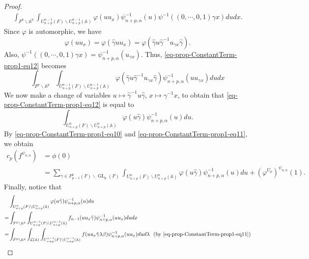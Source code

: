 \documentclass[12pt]{amsart}
\newcommand{\A}{\mathbb{A}}
\theoremstyle{remark}
\DeclareMathOperator{\GL}{GL}
\begin{document}
\begin{proof}
\begin{equation}
\label{eq-prop-ConstantTerm-prop1-eq12}
\begin{split}
\int_{F^p\backslash \A^p} 	\int_{U_{n+p}^{n-1}(F)\backslash U_{n+p}^{n-1}(\A)} \varphi( u u_x) \psi_{n+p,\alpha}^{-1}(u ) \psi^{-1}( (0, \cdots, 0,1)\gamma x)dudx.
\end{split}
\end{equation}
Since $\varphi$ is automorphic, we have
\begin{equation*}
\varphi( u u_x)= \varphi( \hat{\gamma} u u_x) = 	\varphi( \hat{\gamma} u \hat{\gamma}^{-1}  u_{\gamma x} \hat{\gamma}).
\end{equation*}
Also, $\psi^{-1}( (0, \cdots, 0,1)\gamma x)=\psi_{n+p,\alpha}^{-1}( u_{\gamma x})$.
Thus, \eqref{eq-prop-ConstantTerm-prop1-eq12} becomes
\begin{equation*}
	\int_{F^p\backslash \A^p} 	\int_{U_{n+p}^{n-1}(F)\backslash U_{n+p}^{n-1}(\A)} \varphi(  \hat{\gamma} u \hat{\gamma}^{-1}  u_{\gamma x} \hat{\gamma} ) \psi_{n+p,\alpha}^{-1}(u u_{\gamma x})dudx
\end{equation*}
We now make a change of variables $u\mapsto \hat{\gamma}^{-1}u\hat{\gamma}$, $x\mapsto \gamma^{-1}x$, 
to obtain that \eqref{eq-prop-ConstantTerm-prop1-eq12} is equal to
\begin{equation*}
	 	\int_{U_{n+p}^{n}(F)\backslash U_{n+p}^{n}(\A)} \varphi(  u \hat{\gamma} ) \psi_{n+p,\alpha}^{-1}(u )du.
\end{equation*}
By \eqref{eq-prop-ConstantTerm-prop1-eq10} and \eqref{eq-prop-ConstantTerm-prop1-eq11}, we obtain
\begin{equation*}
\begin{split}
c_p(f^{\psi_{n,\alpha}}) &=\phi(0)\\
&=	\sum_{\gamma\in P_{p-1}^1(F)\backslash \GL_p(F)} \int_{U_{n+p}^{n}(F)\backslash U_{n+p}^{n}(\A)} \varphi(  u \hat{\gamma} ) \psi_{n+p,\alpha}^{-1}(u )du + (\varphi^{U_p})^{\psi_{n,\alpha}}(1).
\end{split}
\end{equation*}
Finally, notice that
\begin{equation*}
\begin{split}
&\int_{U_{n+p}^{n}(F)\backslash U_{n+p}^{n}(\A)} \varphi(  u \hat{\gamma} ) \psi_{n+p,\alpha}^{-1}(u )du \\
=&	\int_{F^p\backslash \A^p} 	\int_{U_{n+p}^{n-1}(F)\backslash U_{n+p}^{n-1}(\A)} f_{n-1}( u u_{x} \hat{\gamma} ) \psi_{n+p,\alpha}^{-1}( u u_x) du dx\\
=& \int_{F^p\backslash \A^p} \int_{\mathcal{L}(\A)}	\int_{U_{n+p}^{n-1}(F)\backslash U_{n+p}^{n-1}(\A)} f( u u_x \hat{\gamma}   \lambda \beta )\psi_{n+p,\alpha}^{-1}(u u_x ) du   d\lambda \ \ (\text{by } \eqref{eq-prop-ConstantTerm-prop1-eq11}) \\

\end{split}
\end{equation*}
\end{proof}
\end{document}
